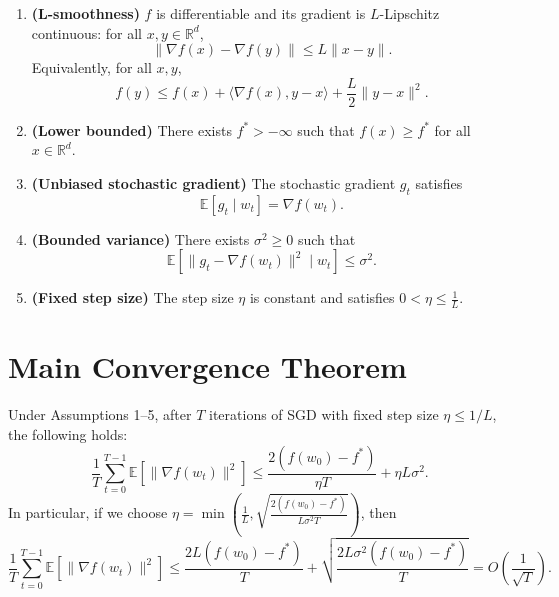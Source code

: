 \documentclass{article}
\begin{document}
\begin{enumerate}
    \item \textbf{(L-smoothness)} $f$ is differentiable and its gradient is $L$-Lipschitz continuous: for all $x, y \in \mathbb{R}^d$,
        \begin{equation}
            \|\nabla f(x) - \nabla f(y)\| \leq L \|x - y\|.
        \end{equation}
        Equivalently, for all $x, y$,
        \begin{equation}
            f(y) \leq f(x) + \langle \nabla f(x), y-x \rangle + \frac{L}{2} \|y-x\|^2. \tag{A1}
        \end{equation}
    \item \textbf{(Lower bounded)} There exists $f^* > -\infty$ such that $f(x) \geq f^*$ for all $x \in \mathbb{R}^d$.
    \item \textbf{(Unbiased stochastic gradient)} The stochastic gradient $g_t$ satisfies
        \begin{equation}
            \mathbb{E}[g_t \mid w_t] = \nabla f(w_t). \tag{A2}
        \end{equation}
    \item \textbf{(Bounded variance)} There exists $\sigma^2 \geq 0$ such that
        \begin{equation}
            \mathbb{E}[\|g_t - \nabla f(w_t)\|^2 \mid w_t] \leq \sigma^2. \tag{A3}
        \end{equation}
    \item \textbf{(Fixed step size)} The step size $\eta$ is constant and satisfies $0 < \eta \leq \frac{1}{L}$.
\end{enumerate}

\section*{Main Convergence Theorem}
Under Assumptions 1--5, after $T$ iterations of SGD with fixed step size $\eta \leq 1/L$, the following holds:
\begin{equation}
    \frac{1}{T} \sum_{t=0}^{T-1} \mathbb{E}[\|\nabla f(w_t)\|^2] \leq \frac{2(f(w_0) - f^*)}{\eta T} + \eta L \sigma^2. \tag{1}
\end{equation}
In particular, if we choose $\eta = \min\left(\frac{1}{L}, \sqrt{\frac{2(f(w_0)-f^*)}{L\sigma^2 T}}\right)$, then
\begin{equation}
    \frac{1}{T} \sum_{t=0}^{T-1} \mathbb{E}[\|\nabla f(w_t)\|^2] \leq \frac{2L(f(w_0)-f^*)}{T} + \sqrt{\frac{2L\sigma^2(f(w_0)-f^*)}{T}} = O\left(\frac{1}{\sqrt{T}}\right).
\end{equation}
\end{document}
